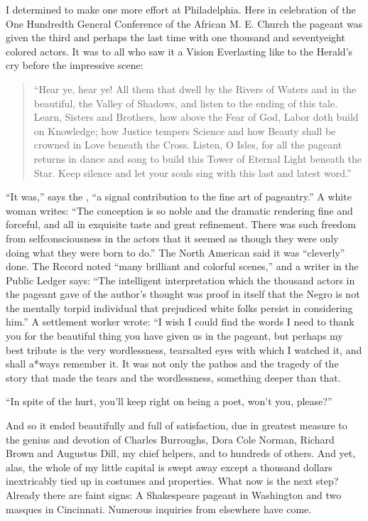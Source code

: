 \documentclass[letterpaper,10pt,english]{jupyterBook}
\begin{document}
\sphinxAtStartPar
I determined to make one more effort at Philadelphia. Here in celebration of the One Hundredth General Conference of the African M. E. Church the pageant was given the third and perhaps the last time with one thousand and seventy\sphinxhyphen{}eight colored actors. It was to all who saw it a Vision Everlasting like to the Herald’s cry before the impressive scene:
\begin{quote}

\sphinxAtStartPar
“Hear ye, hear ye! All them that dwell by the Rivers of Waters and in the beautiful, the Valley of Shadows, and listen to the ending of this tale. Learn, Sisters and Brothers, how above the Fear of God, Labor doth build on Knowledge; how Justice tempers Science and how Beauty shall be crowned in Love beneath the Cross. Listen, O Isles, for all the pageant returns in dance and song to build this Tower of Eternal Light beneath the Star. Keep silence and let your souls sing with this last and latest word.”
\end{quote}

\sphinxAtStartPar
“It was,” says the , “a signal contribution to the fine art of pageantry.” A white woman writes: “The conception is so noble and the dramatic rendering fine and forceful, and all in exquisite taste and great refinement. There was such freedom from self\sphinxhyphen{}consciousness in the actors that it seemed as though they were only doing what they were born to do.” The North American said it was “cleverly” done. The Record noted “many brilliant and colorful scenes,” and a writer in the Public Ledger says: “The intelligent interpretation which the thousand actors in the pageant gave of the author’s thought was proof in itself that the Negro is not the mentally torpid individual that prejudiced white folks persist in considering him.” A settlement worker wrote: “I wish I could find the words I need to thank you for the beautiful thing you have given us in the pageant, but perhaps my best tribute is the very wordlessness, tear\sphinxhyphen{}salted eyes with which I watched it, and shall a*ways remember it. It was not only the pathos and the tragedy of the story that made the tears and the wordlessness, something deeper than that.

\sphinxAtStartPar
“In spite of the hurt, you’ll keep right on being a poet, won’t you, please?”

\sphinxAtStartPar
And so it ended beautifully and full of satisfaction, due in greatest measure to the genius and devotion of Charles Burroughs, Dora Cole Norman, Richard Brown and Augustus Dill, my chief helpers, and to hundreds of others. And yet, alas, the whole of my little capital is swept away except a thousand dollars inextricably tied up in costumes and properties. What now is the next step? Already there are faint signs: A Shakespeare pageant in Washington and two masques in Cincinnati. Numerous inquiries from elsewhere have come.
\end{document}
